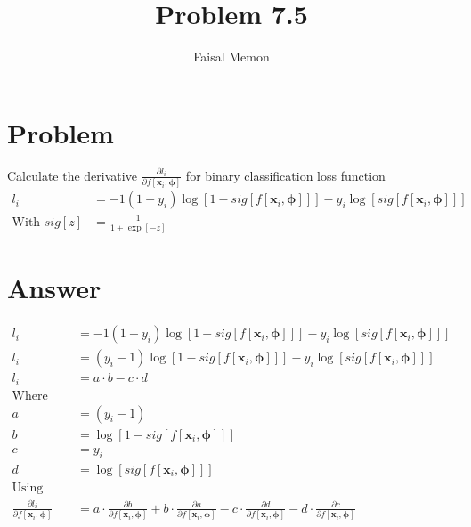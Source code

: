\documentclass{article}
\title{Problem 7.5}
\author{Faisal Memon}
\begin{document}
\maketitle

\section{Problem}

Calculate the derivative $\frac{\partial{l_{i}}}{\partial{f[\boldsymbol{x}_{i}, \boldsymbol{\phi}]}}$
for binary classification loss function
\begin{align*}
   l_{i} &= -1 (1 - y_{i}) \log [ 1 - sig[f[\boldsymbol{x}_{i}, \boldsymbol{\phi}]]] - y_{i} \log [ sig[f[\boldsymbol{x}_{i}, \boldsymbol{\phi}]]]
   \\
   \text{With } sig[z] &= \frac{1}{1 + \exp [-z]}
\end{align*}

\section{Answer}

\begin{align*}
   l_{i} &= -1 (1 - y_{i}) \log [ 1 - sig[f[\boldsymbol{x}_{i}, \boldsymbol{\phi}]]] - y_{i} \log [ sig[f[\boldsymbol{x}_{i}, \boldsymbol{\phi}]]] \\
   l_{i} &= (y_{i} - 1) \log [ 1 - sig[f[\boldsymbol{x}_{i}, \boldsymbol{\phi}]]] - y_{i} \log [ sig[f[\boldsymbol{x}_{i}, \boldsymbol{\phi}]]] \\
   l_{i} &= a \cdot b  - c \cdot d \\
   \text{Where} \\
   a &= (y_{i} - 1) \\
   b &= \log [ 1 - sig[f[\boldsymbol{x}_{i}, \boldsymbol{\phi}]]] \\
   c &= y_{i} \\
   d &= \log [ sig[f[\boldsymbol{x}_{i}, \boldsymbol{\phi}]]] \\
   \text{Using Chain Rule twice} \\
   \frac{\partial{l_{i}}}{\partial{f[\boldsymbol{x}_{i}, \boldsymbol{\phi}]}} &=
   a \cdot \frac{\partial{b}}{\partial{f[\boldsymbol{x}_{i}, \boldsymbol{\phi}]}}
   + b \cdot \frac{\partial{a}}{\partial{f[\boldsymbol{x}_{i}, \boldsymbol{\phi}]}}
   - c \cdot \frac{\partial{d}}{\partial{f[\boldsymbol{x}_{i}, \boldsymbol{\phi}]}}
   - d \cdot \frac{\partial{c}}{\partial{f[\boldsymbol{x}_{i}, \boldsymbol{\phi}]}}
\end{align*}
\end{document}
